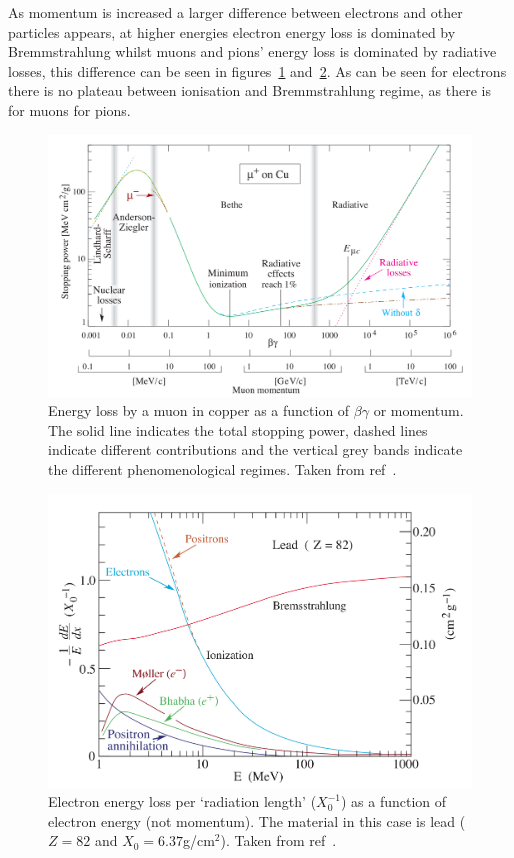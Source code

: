 As momentum is increased a larger difference between electrons and other particles appears, at higher energies electron energy loss is dominated by Bremmstrahlung whilst muons and pions' energy loss is dominated by radiative losses, this difference can be seen in figures~\ref{fig:mu-pi-bethe} and~\ref{fig:electron_energy_loss}. As can be seen for electrons there is no plateau between ionisation and Bremmstrahlung regime, as there is for muons for pions.  
\begin{figure}[hptb] 
  \centering
    \includegraphics[width=.9\textwidth]{images/mu-pi-bethe.png}
  \caption{Energy loss by a muon in copper as a function of \( \beta\gamma \) or momentum. The solid line indicates the total stopping power, dashed lines indicate different contributions and the vertical grey bands indicate the different phenomenological regimes. Taken from ref~\cite{PDG particles in matter ref}.}
  \label{fig:mu-pi-bethe}
\end{figure}
\begin{figure}[hptb]
  \centering  
    \includegraphics[width=.9\textwidth]{images/electron_energy_loss.png}
  \caption{Electron energy loss per `radiation length' (\( X_0^{-1} \)) as a function of electron energy (not momentum). The material in this case is lead (\(Z=82\) and \(X_0 = 6.37\)g/cm\(^2\)). Taken from ref~\cite{PDG particles in matter ref}.}
  \label{fig:electron_energy_loss}
\end{figure}

